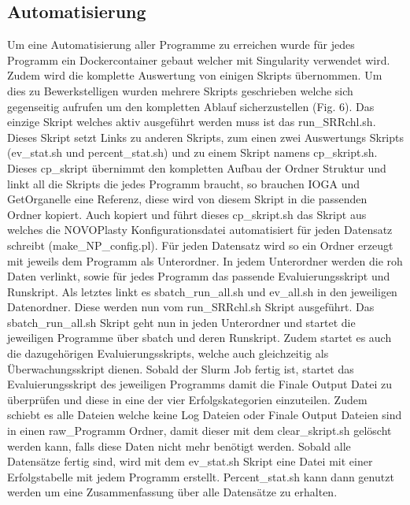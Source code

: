 \documentclass{scrartcl}
\begin{document}
\subsection{Automatisierung}
\label{sec-4-1}
Um eine Automatisierung aller Programme zu erreichen wurde für jedes Programm ein Dockercontainer gebaut welcher mit Singularity verwendet wird. Zudem wird die komplette Auswertung von einigen Skripts 
übernommen. Um dies zu Bewerkstelligen wurden mehrere Skripts geschrieben welche sich gegenseitig aufrufen um den kompletten Ablauf sicherzustellen (Fig. 6). 
Das einzige Skript welches aktiv ausgeführt werden muss ist das run\_SRRchl.sh. Dieses Skript setzt Links zu anderen Skripts, zum einen zwei Auswertungs Skripts (ev\_stat.sh und percent\_stat.sh) und
zu einem Skript namens cp\_skript.sh. Dieses cp\_skript übernimmt den kompletten Aufbau der Ordner Struktur und linkt all die Skripts die jedes Programm braucht, so brauchen IOGA und GetOrganelle
eine Referenz, diese wird von diesem Skript in die passenden Ordner kopiert. Auch kopiert und führt dieses cp\_skript.sh das Skript aus welches die NOVOPlasty Konfigurationsdatei automatisiert für jeden
Datensatz schreibt (make\_NP\_config.pl). Für jeden Datensatz wird so ein Ordner erzeugt mit jeweils dem Programm als Unterordner. In jedem Unterordner werden die roh Daten verlinkt, sowie für jedes Programm
das passende Evaluierungsskript und Runskript. Als letztes linkt es sbatch\_run\_all.sh und ev\_all.sh in den jeweiligen Datenordner. Diese werden nun vom run\_SRRchl.sh Skript ausgeführt. Das sbatch\_run\_all.sh
Skript geht nun in jeden Unterordner und startet die jeweiligen Programme über sbatch und deren Runskript. Zudem startet es auch die dazugehörigen Evaluierungsskripts, welche auch gleichzeitig als Überwachungsskript 
dienen. Sobald der Slurm Job fertig ist, startet das Evaluierungsskript des jeweiligen Programms damit die Finale Output Datei zu überprüfen und diese in eine der vier Erfolgskategorien einzuteilen. Zudem
schiebt es alle Dateien welche keine Log Dateien oder Finale Output Dateien sind in einen raw\_Programm Ordner, damit dieser mit dem clear\_skript.sh gelöscht werden kann, falls diese Daten nicht mehr benötigt werden.
Sobald alle Datensätze fertig sind, wird mit dem ev\_stat.sh Skript eine Datei mit einer Erfolgstabelle mit jedem Programm erstellt. Percent\_stat.sh kann dann genutzt werden um eine Zusammenfassung über alle Datensätze 
zu erhalten.
\end{document}
